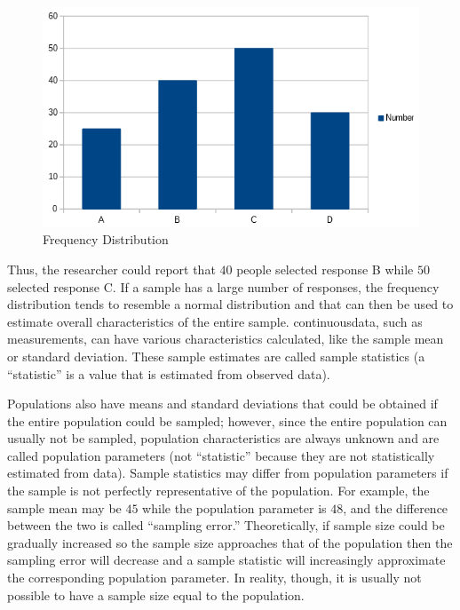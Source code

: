 \begin{figure}[H]
	\centering
	\includegraphics[width=\maxwidth{.95\linewidth}]{gfx/07-12}
	\caption{Frequency Distribution}
	\label{07:fig12}
\end{figure}

Thus, the researcher could report that $ 40 $ people selected response B while $ 50 $ selected response C. If a sample has a large number of responses, the frequency distribution tends to resemble a normal distribution and that can then be used to estimate overall characteristics of the entire sample. \Gls{continuousdata}, such as measurements, can have various characteristics calculated, like the sample mean or standard deviation. These sample estimates are called sample statistics (a ``statistic'' is a value that is estimated from observed data). 

Populations also have means and standard deviations that could be obtained if the entire population could be sampled; however, since the entire population can usually not be sampled, population characteristics are always unknown and are called population parameters (not ``statistic'' because they are not statistically estimated from data). Sample statistics may differ from population parameters if the sample is not perfectly representative of the population. For example, the sample mean may be $ 45 $ while the population parameter is $ 48 $, and the difference between the two is called ``sampling error.'' Theoretically, if sample size could be gradually increased so the sample size approaches that of the population then the sampling error will decrease and a sample statistic will increasingly approximate the corresponding population parameter. In reality, though, it is usually not possible to have a sample size equal to the population.

